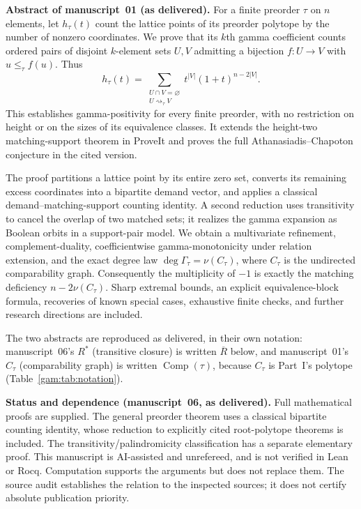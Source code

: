 \documentclass[11pt]{article}
\numberwithin{equation}{section}
\theoremstyle{definition}
\newcommand{\Comp}{\operatorname{Comp}}
\newcommand{\match}{\rightsquigarrow}
\begin{document}
\begin{tcolorbox}[colback=white,colframe=Pale,arc=1mm]
\small\textbf{Abstract of manuscript~01 (as delivered).}
For a finite preorder $\tau$ on $n$ elements, let $h_\tau(t)$ count the lattice
points of its preorder polytope by the number of nonzero coordinates. We prove
that its $k$th gamma coefficient counts ordered pairs of disjoint $k$-element
sets $U,V$ admitting a bijection $f:U\to V$ with $u\le_\tau f(u)$. Thus
\[
 h_\tau(t)=\sum_{\substack{U\cap V=\varnothing\\U\match_\tau V}}
 t^{|V|}(1+t)^{n-2|V|}.
\]
This establishes gamma-positivity for every finite preorder, with no restriction
on height or on the sizes of its equivalence classes. It extends the
height-two matching-support theorem in ProveIt and proves the full
Athanasiadis--Chapoton conjecture in the cited version.

The proof partitions a lattice point by its entire zero set, converts its
remaining excess coordinates into a bipartite demand vector, and applies a
classical demand--matching-support counting identity. A second reduction uses
transitivity to cancel the overlap of two matched sets; it realizes the gamma
expansion as Boolean orbits in a support-pair model. We obtain a multivariate
refinement, complement-duality, coefficientwise gamma-monotonicity under
relation extension, and the exact degree law
$\deg\Gamma_\tau=\nu(C_\tau)$, where $C_\tau$ is the undirected comparability
graph. Consequently the multiplicity of $-1$ is exactly the matching deficiency
$n-2\nu(C_\tau)$. Sharp extremal bounds, an explicit equivalence-block formula,
recoveries of known special cases, exhaustive finite checks, and further
research directions are included.
\end{tcolorbox}
\noindent The two abstracts are reproduced as delivered, in their own
notation: manuscript~06's $R^*$ (transitive closure) is written $\overline R$
below, and manuscript~01's $C_\tau$ (comparability graph) is written
$\Comp(\tau)$, because $C_\tau$ is Part~I's polytope
(Table~\ref{gam:tab:notation}).

\begin{statusbox}
\small\textbf{Status and dependence (manuscript~06, as delivered).} Full
mathematical proofs are supplied. The general preorder theorem uses a
classical bipartite counting identity, whose reduction to explicitly cited
root-polytope theorems is included. The transitivity/palindromicity
classification has a separate elementary proof. This manuscript is
AI-assisted and unrefereed, and is not verified in Lean or Rocq. Computation
supports the arguments but does not replace them. The source audit
establishes the relation to the inspected sources; it does not certify
absolute publication priority.
\end{statusbox}
\end{document}
